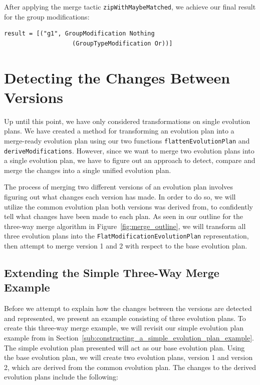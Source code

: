 \documentclass[a4paper,english]{ifimaster}
\begin{document}
After applying the merge tactic \texttt{zip\-With\-Maybe\-Matched}, we achieve our final result for the group modifications:

\begin{verbatim}
result = [("g1", GroupModification Nothing 
                   (GroupTypeModification Or))]
\end{verbatim}

\section{Detecting the Changes Between Versions}%
\label{sec:detecting_the_changes_between_versions}

Up until this point, we have only considered transformations on single evolution plans. We have created a method for transforming an evolution plan into a merge-ready evolution plan using our two functions \texttt{flatten\-Evolution\-Plan} and \texttt{derive\-Modifications}. However, since we want to merge two evolution plans into a single evolution plan, we have to figure out an approach to detect, compare and merge the changes into a single unified evolution plan.

The process of merging two different versions of an evolution plan involves figuring out what changes each version has made. In order to do so, we will utilize the common evolution plan both versions was derived from, to confidently tell what changes have been made to each plan. As seen in our outline for the three-way merge algorithm in Figure~\vref{fig:merge_outline}, we will transform all three evolution plans into the \texttt{Flat\-Modification\-Evolution\-Plan} representation, then attempt to merge version 1 and 2 with respect to the base evolution plan.

\subsection{Extending the Simple Three-Way Merge Example}%
\label{sub:extending_the_simple_three_way_merge_example}

Before we attempt to explain how the changes between the versions are detected and represented, we present an example consisting of three evolution plans. To create this three-way merge example, we will revisit our simple evolution plan example from in Section~\vref{sub:constructing_a_simple_evolution_plan_example}. The simple evolution plan presented will act as our base evolution plan. Using the base evolution plan, we will create two evolution plans, version 1 and version 2, which are derived from the common evolution plan. The changes to the derived evolution plans include the following:
\end{document}
